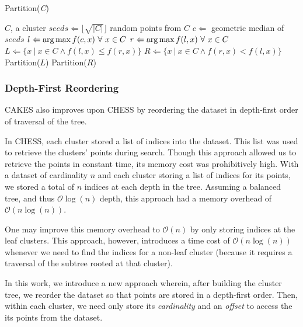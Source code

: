 \begin{algorithm} %
    \caption{Partition(\emph{C})} %
    \label{alg:methods:clustering:partition} %
    \begin{algorithmic} %
        \REQUIRE $C$, a cluster
        \STATE $seeds \Leftarrow \lfloor \sqrt{|C|} \rfloor$ random points from $C$
        \STATE $c \Leftarrow$ geometric median of $seeds$
        \STATE $l \Leftarrow \operatorname*{arg\,max} f(c, x) \ \forall \ x \in C$
        \STATE $r \Leftarrow \argmax f(l, x) \ \forall \ x \in C$
        \STATE $L \Leftarrow \{x \ | \ x \in C \land f(l, x) \le f(r, x)\}$
        \STATE $R \Leftarrow \{x \ | \ x \in C \land f(r, x) < f(l, x)\}$
            \STATE Partition($L$)
        \ENDIF
            \STATE Partition($R$)
        \ENDIF
    \end{algorithmic}
\end{algorithm}


\subsubsection {Depth-First Reordering}
\label{subsubsec:methods:clustering:dataset-depth-first-reordering}

CAKES also improves upon CHESS by reordering the dataset in depth-first order of traversal of the tree.

In CHESS, each cluster stored a list of indices into the dataset.
This list was used to retrieve the clusters' points during search.
Though this approach allowed us to retrieve the points in constant time, its memory cost was prohibitively high.
With a dataset of cardinality $n$ and each cluster storing a list of indices for its points, we stored a total of $n$ indices at each depth in the tree.
Assuming a balanced tree, and thus $\mathcal{O}\log(n)$ depth, this approach had a memory overhead of $\mathcal{O}(n\log(n))$.

One may improve this memory overhead to $\mathcal{O}(n)$ by only storing indices at the leaf clusters.
This approach, however, introduces a time cost of $\mathcal{O}(n\log(n))$ whenever we need to find the indices for a non-leaf cluster (because it requires a traversal of the subtree rooted at that cluster).

In this work, we introduce a new approach wherein, after building the cluster tree, we reorder the dataset so that points are stored in a depth-first order.
Then, within each cluster, we need only store its \emph{cardinality} and an \emph{offset} to access the its points from the dataset.


